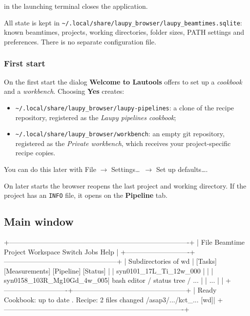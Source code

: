 \documentclass[11pt,a4paper]{article}
\newcommand{\cmd}[1]{\texttt{#1}}
\newcommand{\ui}[1]{\textsf{\textbf{#1}}}
\newcommand{\menu}[1]{\textsf{#1}}
\newcommand{\key}[1]{\tcbox[on line, boxsep=0pt, left=2pt, right=2pt, top=1pt, bottom=1pt, colback=white, colframe=gray!60, boxrule=0.4pt, arc=1.5pt]{\small\ttfamily #1}}
\begin{document}
\key{Ctrl+C} in the launching terminal closes the application.

All state is kept in \cmd{\textasciitilde/.local/share/laupy\_browser/laupy\_beamtimes.sqlite}:
known beamtimes, projects, working directories, folder sizes, PATH settings and preferences.
There is no separate configuration file.

\subsubsection*{First start}

On the first start the dialog \ui{Welcome to Lautools} offers to set up a \emph{cookbook} and a
\emph{workbench}. Choosing \ui{Yes} creates:

\begin{itemize}
  \item \cmd{\textasciitilde/.local/share/laupy\_browser/laupy-pipelines}: a clone of the recipe
    repository, registered as the \emph{Laupy pipelines cookbook};
  \item \cmd{\textasciitilde/.local/share/laupy\_browser/workbench}: an empty git repository,
    registered as the \emph{Private workbench}, which receives your project-specific recipe copies.
\end{itemize}

You can do this later with \menu{File $\rightarrow$ Settings\ldots\ $\rightarrow$ Set up defaults\ldots}.

On later starts the browser reopens the last project and working directory. If the project has an
\cmd{INFO} file, it opens on the \ui{Pipeline} tab.

\subsection{Main window}

\begin{terminal}
+-------------------------------------------------------------------------------+
| File  Beamtime  Project  Workspace  Switch  Jobs  Help                        |
+----------------------------+--------------------------------------------------+
| Subdirectories of wd       |  [Tasks] [Measurements] [Pipeline] [Status]      |
|  syn0101_17L_Ti_12w_000    |                                                  |
|  syn0158_103R_Mg10Gd_4w_005|        bash editor / status tree / ...           |
|  ...                       |                                                  |
+----------------------------+--------------------------------------------------+
| Ready      Cookbook: up to date . Recipe: 2 files changed  /asap3/.../kct_... [wd]|
+-------------------------------------------------------------------------------+
\end{terminal}
\end{document}

